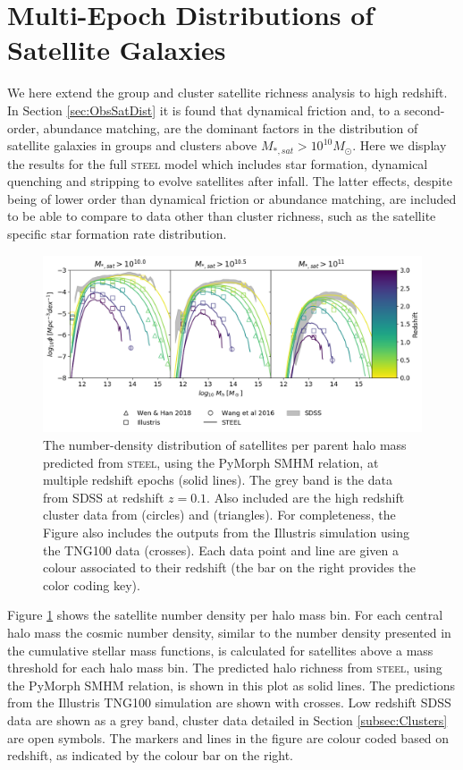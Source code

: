 \section{Multi-Epoch Distributions of Satellite Galaxies}

We here extend the group and cluster satellite richness analysis to high redshift. In Section \ref{sec:ObsSatDist} it is found that dynamical friction and, to a second-order, abundance matching, are the dominant factors in the distribution of satellite galaxies in groups and clusters above $M_{*,sat} > 10^{10} M_{\odot}$. Here we display the results for the full \textsc{steel} model which includes star formation, dynamical quenching and stripping to evolve satellites after infall. The latter effects, despite being of lower order than dynamical friction or abundance matching, are included to be able to compare to data other than cluster richness, such as the satellite specific star formation rate distribution.

\begin{figure}[h]
    \centering
    \includegraphics[width = \linewidth]{Figures/Chapter3/HighzClusters.png}
    \caption{The number-density distribution of satellites per parent halo mass predicted from \textsc{steel}, using the PyMorph SMHM relation, at multiple redshift epochs (solid lines). The grey band is the data from SDSS at redshift $z=0.1$. Also included are the high redshift cluster data from \citet{Wang2016DISCOVERY2.506} (circles) and \citet{Wen2018ARedshifts} (triangles). For completeness, the Figure also includes the outputs from the Illustris simulation using the TNG100 data (crosses). Each data point and line are given a colour associated to their redshift (the bar on the right provides the color coding key).}
    \label{fig:Sat_Dist_High_z}
\end{figure}

Figure \ref{fig:Sat_Dist_High_z} shows the satellite number density per halo mass bin. For each central halo mass the cosmic number density, similar to the number density presented in the cumulative stellar mass functions, is calculated for satellites above a mass threshold for each halo mass bin.
The predicted halo richness from \textsc{steel}, using the PyMorph SMHM relation, is shown in this plot as solid lines. The predictions from the Illustris TNG100 simulation \citep{Nelson2018FirstBimodality, Springel2018FirstClustering} are shown with crosses.  Low redshift SDSS data are shown as a grey band, cluster data detailed in Section \ref{subsec:Clusters} are open symbols. The markers and lines in the figure are colour coded based on redshift, as indicated by the colour bar on the right.

